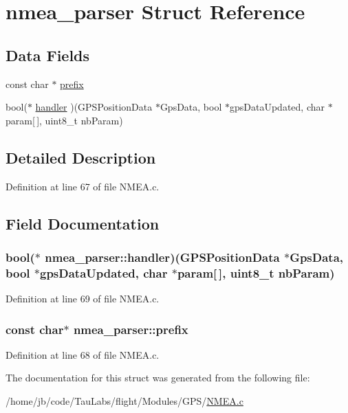 \hypertarget{structnmea__parser}{\section{nmea\-\_\-parser \-Struct \-Reference}
\label{structnmea__parser}
}
\subsection*{\-Data \-Fields}
\begin{DoxyCompactItemize}
\item 
const char $\ast$ \hyperlink{structnmea__parser_aeb7052e0f799ff05ca599e5768f5b09f}{prefix}
\item 
bool($\ast$ \hyperlink{structnmea__parser_a3fd709a52dda42524d0394f5d226daff}{handler} )(\-G\-P\-S\-Position\-Data $\ast$\-Gps\-Data, bool $\ast$gps\-Data\-Updated, char $\ast$param\mbox{[}$\,$\mbox{]}, uint8\-\_\-t nb\-Param)
\end{DoxyCompactItemize}


\subsection{\-Detailed \-Description}


\-Definition at line 67 of file \-N\-M\-E\-A.\-c.



\subsection{\-Field \-Documentation}
\hypertarget{structnmea__parser_a3fd709a52dda42524d0394f5d226daff}{
\subsubsection[{handler}]{\setlength{\rightskip}{0pt plus 5cm}bool($\ast$ {\bf nmea\-\_\-parser\-::handler})(\-G\-P\-S\-Position\-Data $\ast$\-Gps\-Data, bool $\ast$gps\-Data\-Updated, char $\ast$param\mbox{[}$\,$\mbox{]}, uint8\-\_\-t nb\-Param)}}\label{structnmea__parser_a3fd709a52dda42524d0394f5d226daff}


\-Definition at line 69 of file \-N\-M\-E\-A.\-c.

\hypertarget{structnmea__parser_aeb7052e0f799ff05ca599e5768f5b09f}{
\subsubsection[{prefix}]{\setlength{\rightskip}{0pt plus 5cm}const char$\ast$ {\bf nmea\-\_\-parser\-::prefix}}}\label{structnmea__parser_aeb7052e0f799ff05ca599e5768f5b09f}


\-Definition at line 68 of file \-N\-M\-E\-A.\-c.



\-The documentation for this struct was generated from the following file\-:\begin{DoxyCompactItemize}
\item 
/home/jb/code/\-Tau\-Labs/flight/\-Modules/\-G\-P\-S/\hyperlink{_n_m_e_a_8c}{\-N\-M\-E\-A.\-c}\end{DoxyCompactItemize}

